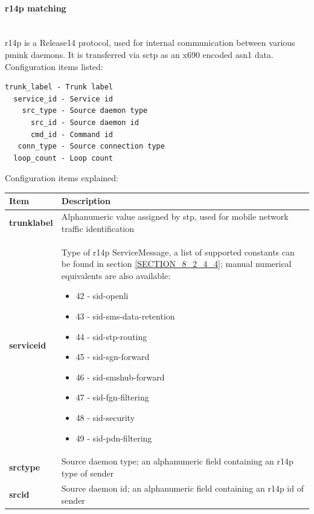 \documentclass[a4paper,latin]{paper}
\begin{document}
\paragraph{\acrfull{r14p} matching}\label{SECTION_R14P_MATCHING}
\mbox{}\\
\acrshort{r14p} is a Release14 protocol, used for internal communication between various \acrfull{pmink} \glspl{daemon}. It is transferred via \acrfull{sctp}
as an \gls{x690} encoded \gls{asn1} data.\\

\noindent{}Configuration items listed:
\begin{lstlisting}[style=BashInputStyle, belowskip=\baselineskip]
 trunk_label - Trunk label
  service_id - Service id
    src_type - Source daemon type
      src_id - Source daemon id  
      cmd_id - Command id      
   conn_type - Source connection type
  loop_count - Loop count 
\end{lstlisting}
\noindent{}Configuration items explained:\\
\begin{tabularx}{\textwidth}{ | l | X |}
	\hline
	Item	 				& Description \\
	\hline
	\textbf{trunk\textunderscore{}label}	& Alphanumeric value assigned by \acrfull{stp}, used for mobile network traffic identification  \\ 
	\textbf{service\textunderscore{}id}	& Type of \acrshort{r14p}  ServiceMessage, a list of supported constants can be found in
                                                  section \ref{SECTION_8_2_4_4}; manual numerical equivalents are also available: 
 						  \begin{itemize}
							\setlength{\itemsep}{0pt}
							\setlength{\parskip}{0pt}
							\setlength{\parsep}{0pt}
							\item 42 - sid-openli
							\item 43 - sid-sms-data-retention
							\item 44 - sid-stp-routing
							\item 45 - sid-sgn-forward
							\item 46 - sid-smshub-forward
							\item 47 - sid-fgn-filtering
							\item 48 - sid-security
							\item 49 - sid-pdn-filtering
						  \end{itemize} \\
	\textbf{src\textunderscore{}type}	& Source \gls{daemon} type; an alphanumeric field containing an \acrshort{r14p} type of sender \\ 
	\textbf{src\textunderscore{}id}		& Source \gls{daemon} id; an alphanumeric field containing an \acrshort{r14p} id of sender \\ 
	\hline
\end{tabularx}\\
\end{document}
